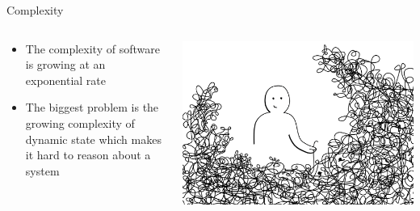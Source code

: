 \documentclass[bigger]{beamer}
\begin{document}
\begin{frame}[label=sec-2-1]{Complexity}
\begin{columns}
\begin{column}{0.45\textwidth}
\begin{block}{}

\begin{itemize}
\item The complexity of software is growing at an exponential rate
\item The biggest problem is the growing complexity of dynamic state which
makes it hard to reason about a system
\end{itemize}
\end{block}
\end{column}


\begin{column}{0.45\textwidth}
\begin{block}{}

\includegraphics[width=.9\linewidth]{images/frp_complexity.png}
\end{block}
\end{column}
\end{columns}
\end{frame}
\end{document}
